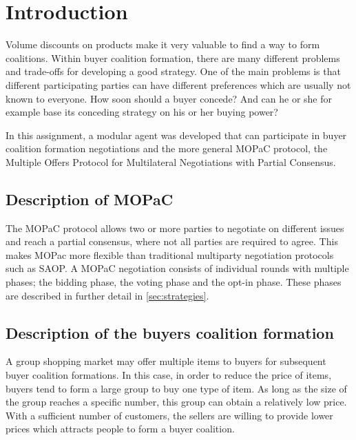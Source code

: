\section*{Introduction} %
\label{sec:introduction}

    Volume discounts on products make it very valuable to find a way to form coalitions. Within buyer coalition formation, there are many different problems and trade-offs for developing a good strategy. One of the main problems is that different participating parties can have different preferences which are usually not known to everyone. How soon should a buyer concede? And can he or she for example base its conceding strategy on his or her buying power? 

    In this assignment, a modular agent was developed that can participate in buyer coalition formation negotiations and the more general MOPaC protocol, the Multiple Offers Protocol for Multilateral Negotiations with Partial Consensus.

    \subsection*{Description of MOPaC}

        The MOPaC protocol allows two or more parties to negotiate on different issues and reach a partial consensus, where not all parties are required to agree. This makes MOPac more flexible than traditional multiparty negotiation protocols such as SAOP.
        A MOPaC negotiation consists of individual rounds with multiple phases; the bidding phase, the voting phase and the opt-in phase. These phases are described in further detail in \autoref{sec:strategies}.

    \subsection*{Description of the buyers coalition formation}

        A group shopping market may offer multiple items to buyers for subsequent buyer coalition formations. In this case, in order to reduce the price of items, buyers tend to form a large group to buy one type of item. As long as the size of the group reaches a specific number, this group can obtain a relatively low price. With a sufficient number of customers, the sellers are willing to provide lower prices which attracts people to form a buyer coalition.

